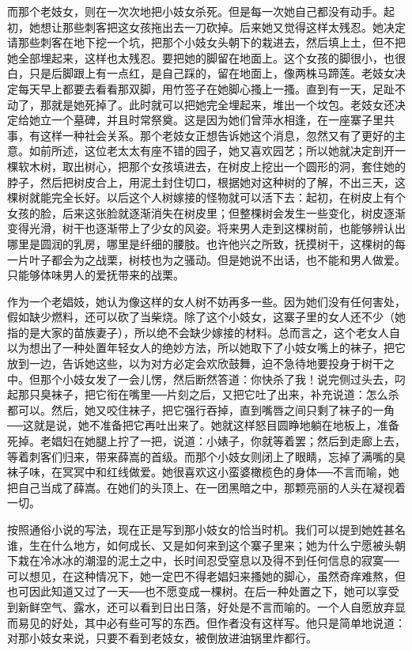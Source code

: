 而那个老妓女，则在一次次地把小妓女杀死。但是每一次她自己都没有动手。起初，她想让那些刺客把这女孩拖出去一刀砍掉。后来她又觉得这样太残忍。她决定请那些刺客在地下挖一个坑，把那个小妓女头朝下的栽进去，然后填上土，但不把她全部埋起来，这样也太残忍。要把她的脚留在地面上。这个女孩的脚很小，也很白，只是后脚跟上有一点红，是自己踩的，留在地面上，像两株马蹄莲。老妓女决定每天早上都要去看看那双脚，用竹签子在她脚心搔上一搔。直到有一天，足趾不动了，那就是她死掉了。此时就可以把她完全埋起来，堆出一个坟包。老妓女还决定给她立一个墓碑，并且时常祭奠。这是因为她们曾萍水相逢，在一座寨子里共事，有这样一种社会关系。那个老妓女正想告诉她这个消息，忽然又有了更好的主意。如前所述，这位老太太有座不错的园子，她又喜欢园艺；所以她就决定剖开一棵软木树，取出树心，把那个女孩填进去，在树皮上挖出一个圆形的洞，套住她的脖子，然后把树皮合上，用泥土封住切口，根据她对这种树的了解，不出三天，这棵树就能完全长好。以后这个人树嫁接的怪物就可以活下去：起初，在树皮上有个女孩的脸，后来这张脸就逐渐消失在树皮里；但整棵树会发生一些变化，树皮逐渐变得光滑，树干也逐渐带上了少女的风姿。将来男人走到这棵树前，也能够辨认出哪里是圆润的乳房，哪里是纤细的腰肢。也许他兴之所致，抚摸树干，这棵树的每一片叶子都会为之战栗，树枝也为之骚动。但是她说不出话，也不能和男人做爱。只能够体味男人的爱抚带来的战栗。 

作为一个老娼妓，她认为像这样的女人树不妨再多一些。因为她们没有任何害处，假如缺少燃料，还可以砍了当柴烧。除了这个小妓女，这寨子里的女人还不少（她指的是大家的苗族妻子），所以绝不会缺少嫁接的材料。总而言之，这个老女人自以为想出了一种处置年轻女人的绝妙方法，所以她取下了小妓女嘴上的袜子，把它放到一边，告诉她这些，以为对方必定会欢欣鼓舞，迫不急待地要投身于树干之中。但那个小妓女发了一会儿愣，然后断然答道：你快杀了我！说完侧过头去，叼起那只臭袜子，把它衔在嘴里──片刻之后，又把它吐了出来，补充说道：怎么杀都可以。然后，她又咬住袜子，把它强行吞掉，直到嘴唇之间只剩了袜子的一角──这就是说，她不准备把它再吐出来了。她就这样怒目圆睁地躺在地板上，准备死掉。老娼妇在她腿上拧了一把，说道：小婊子，你就等着罢；然后到走廊上去，等着刺客们归来，带来薛嵩的首级。而那个小妓女则闭上了眼睛，忘掉了满嘴的臭袜子味，在冥冥中和红线做爱。她很喜欢这小蛮婆橄榄色的身体──不言而喻，她把自己当成了薛嵩。在她们的头顶上、在一团黑暗之中，那颗亮丽的人头在凝视着一切。 

按照通俗小说的写法，现在正是写到那小妓女的恰当时机。我们可以提到她姓甚名谁，生在什么地方，如何成长、又是如何来到这个寨子里来；她为什么宁愿被头朝下栽在冷冰冰的潮湿的泥土之中，长时间忍受窒息以及得不到任何信息的寂寞──可以想见，在这种情况下，她一定巴不得老娼妇来搔她的脚心，虽然奇痒难熬，但也可因此知道又过了一天──也不愿变成一棵树。在后一种处置之下，她可以享受到新鲜空气、露水，还可以看到日出日落，好处是不言而喻的。一个人自愿放弃显而易见的好处，其中必有些可写的东西。但作者没有这样写。他只是简单地说道：对那小妓女来说，只要不看到老妓女，被倒放进油锅里炸都行。 

